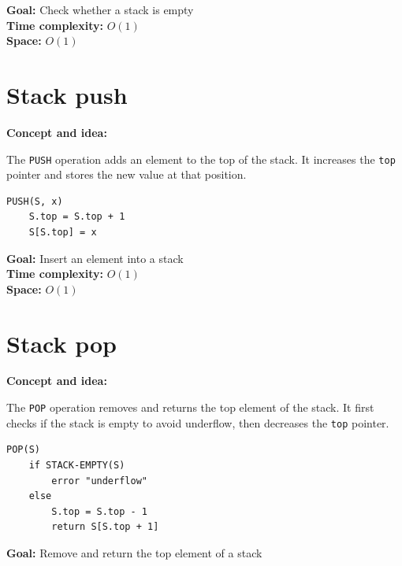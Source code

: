 \documentclass[11pt,a4paper,openany]{book}
\begin{document}
\textbf{Goal:} Check whether a stack is empty \\
\textbf{Time complexity:} $O(1)$ \\
\textbf{Space:} $O(1)$








\vspace{2cm}








\section{Stack push}
\textbf{Concept and idea:}

The \texttt{PUSH} operation adds an element to the top of the stack.  
It increases the \texttt{top} pointer and stores the new value at that position.

\begin{lstlisting}
PUSH(S, x)
    S.top = S.top + 1
    S[S.top] = x
\end{lstlisting}

\textbf{Goal:} Insert an element into a stack \\

\textbf{Time complexity:} $O(1)$ \\

\textbf{Space:} $O(1)$






\vspace{2cm}








\section{Stack pop}
\textbf{Concept and idea:}

The \texttt{POP} operation removes and returns the top element of the stack.  
It first checks if the stack is empty to avoid underflow, then decreases the \texttt{top} pointer.

\begin{lstlisting}
POP(S)
    if STACK-EMPTY(S)
        error "underflow"
    else
        S.top = S.top - 1
        return S[S.top + 1]
\end{lstlisting}

\textbf{Goal:} Remove and return the top element of a stack \\
\end{document}
